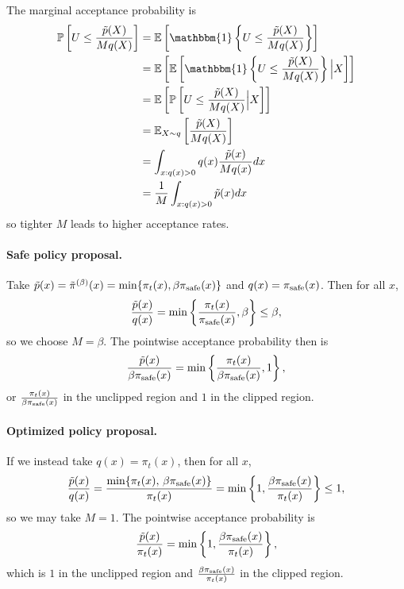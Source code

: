 The marginal acceptance probability is
\begin{align}
\mathbb{P} \left[U \leq \frac{\tilde p(X)}{M q(X)} \right] 
&= \mathbb{E} \left[ \mathbbm{1} \left\{U \leq \frac{\tilde p(X)}{M q(X)} \right\} \right] \nonumber \\
&= \mathbb{E} \left[ \mathbb{E}\left[ \mathbbm{1} \left\{U \leq \frac{\tilde p(X)}{M q(X)} \right\} \Big| X \right] \right] \nonumber \\
&= \mathbb{E} \left[ \mathbb{P}\left[ U \leq \frac{\tilde p(X)}{M q(X)}  \Big| X \right] \right] \nonumber \\
&= \mathbb{E}_{X\sim q}\left[\frac{\tilde p(X)}{M q(X)} \right] \nonumber \\
&= \int_{x: q(x)>0} q(x) \frac{\tilde p(x)}{M q(x)} dx \nonumber \\
&= \frac{1}{M}\int_{x: q(x)>0} \tilde p(x) dx
\label{eq:app:accept_prob_rejection_sampling}
\end{align}
so tighter $M$ leads to higher acceptance rates.

\paragraph{Safe policy proposal.} Take $\tilde p(x) = \tilde \pi^{(\beta)}(x) = \min\{ \pi_t(x), \beta \pi_{\rm safe}(x) \}$ and $q(x) = \pi_{\rm safe}(x)$. Then for all $x$,
$$
\frac{\tilde p(x)}{q(x)} = \min \left\{ \frac{\pi_t(x)}{\pi_{\rm safe}(x)}, \beta \right\} \leq \beta,
$$
so we choose $M = \beta$. The pointwise acceptance probability then is
\begin{equation}
\frac{\tilde p(x)}{\beta \pi_{\rm safe}(x)} = \min\left\{\frac{\pi_t(x)}{\beta\pi_{\rm safe}(x)}, 1 \right\},
\label{eq:app:accept_prob_safe_proposal}
\end{equation}
or $\frac{\pi_t(x)}{\beta\pi_{\rm safe}(x)}$ in the unclipped region and $1$ in the clipped region.

\paragraph{Optimized policy proposal.} If we instead take $q(x) = \pi_t(x)$, then for all $x$,
$$
\frac{\tilde p(x)}{q(x)}
=
\frac{\min\{\pi_t(x),\,\beta\pi_{\rm safe}(x)\}}{\pi_t(x)}
=
\min \left\{1, \frac{\beta\pi_{\rm safe}(x)}{\pi_t(x)} \right\}
 \leq 1,
$$
so we may take $M=1$.
The pointwise acceptance probability is
\begin{align}
\frac{\tilde p(x)}{\pi_t(x)}
=
\min\left\{1, \frac{\beta\pi_{\rm safe}(x)}{\pi_t(x)} \right\},
\label{eq:app:accept_prob_opt_proposal}
\end{align}
which is $1$ in the unclipped region and $\frac{\beta\pi_{\rm safe}(x)}{\pi_t(x)}$ in the clipped region.


